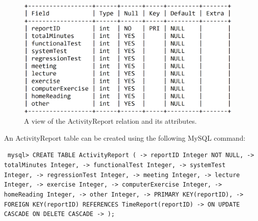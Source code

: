 \documentclass{article}
\begin{document}
\begin{figure}[H]
     \centering
     \includegraphics[width=11cm]{images/SQL_tables/activityreport.png}
     \renewcommand\figurename{Figure}
     \caption{A view of the ActivityReport relation and its attributes.}
     \label{fig:my_label}
 \end{figure}
\newline

An ActivityReport table can be created using the following MySQL command:
\newline

\small
\texttt{
\noindent mysql> CREATE TABLE ActivityReport (\newline
\indent\indent\indent -> reportID Integer NOT NULL,\newline
\indent\indent\indent -> totalMinutes Integer,\newline
\indent\indent\indent -> functionalTest Integer,\newline
\indent\indent\indent -> systemTest Integer,\newline
\indent\indent\indent -> regressionTest Integer,\newline
\indent\indent\indent -> meeting Integer,\newline
\indent\indent\indent -> lecture Integer,\newline
\indent\indent\indent -> exercise Integer,\newline
\indent\indent\indent -> computerExercise Integer,\newline
\indent\indent\indent -> homeReading Integer,\newline
\indent\indent\indent -> other Integer,\newline
\indent\indent\indent -> PRIMARY KEY(reportID),\newline
\indent\indent\indent -> FOREIGN KEY(reportID) REFERENCES TimeReport(reportID)\newline
\indent\indent\indent -> ON UPDATE CASCADE ON DELETE CASCADE\newline
\indent\indent\indent -> );\newline
}
\normalsize
\end{document}
